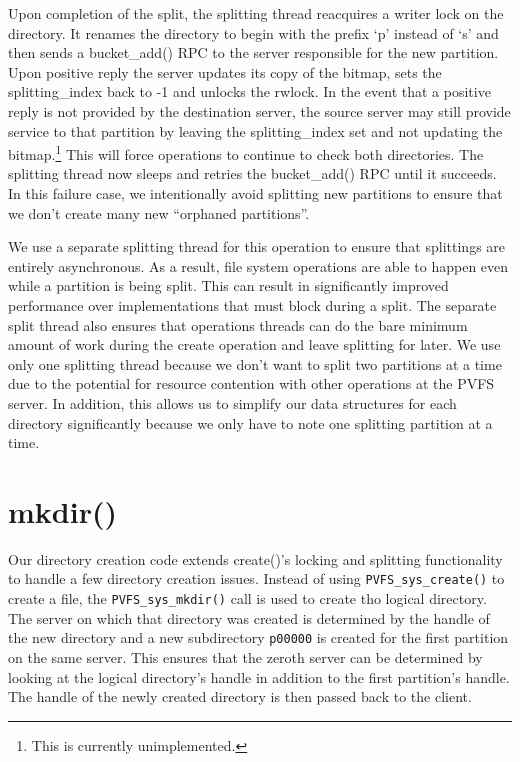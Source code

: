 \documentclass[letterpaper]{article}
\newcommand{\code}[1]{\texttt{#1}}
\begin{document}
Upon completion of the split, the splitting thread reacquires a writer lock on
the directory.  It renames the directory to begin with the prefix `p' instead of
`s' and then sends a bucket\_\-add() RPC to the server responsible for the new
partition.  Upon positive reply the server updates its copy of the bitmap, sets
the splitting\_\-index back to -1 and unlocks the rwlock.  In the event that
a positive reply is not provided by the destination server, the source server
may still provide service to that partition by leaving the splitting\_\-index set
and not updating the bitmap.\footnote{This is currently unimplemented.}  This
will force operations to continue to check both directories.  The splitting
thread now sleeps and retries the bucket\_\-add() RPC until it succeeds.  In
this failure case, we intentionally avoid splitting new partitions to ensure
that we don't create many new ``orphaned partitions''.

We use a separate splitting thread for this operation to ensure that splittings
are entirely asynchronous.  As a result, file system operations are able to
happen even while a partition is being split.  This can result in significantly
improved performance over implementations that must block during a split.  The
separate split thread also ensures that operations threads can do the bare
minimum amount of work during the create operation and leave splitting for
later.  We use only one splitting thread because we don't want to split two
partitions at a time due to the potential for resource contention with other
operations at the PVFS server.  In addition, this allows us to simplify our data
structures for each directory significantly because we only have to note one
splitting partition at a time.

\section{mkdir()}
Our directory creation code extends create()'s locking and splitting
functionality to handle a few directory creation issues.  Instead of using
\code{PVFS\_\-sys\_\-create()} to create a file, the \code{PVFS\_\-sys\_\-mkdir()} call is
used to create tho logical directory.  The server on which that directory was
created is determined by the handle of the new directory and a new subdirectory
\code{p00000} is created for the first partition on the same server.  This
ensures that the zeroth server can be determined by looking at the logical
directory's handle in addition to the first partition's handle.  The handle of
the newly created directory is then passed back to the client.
\end{document}
